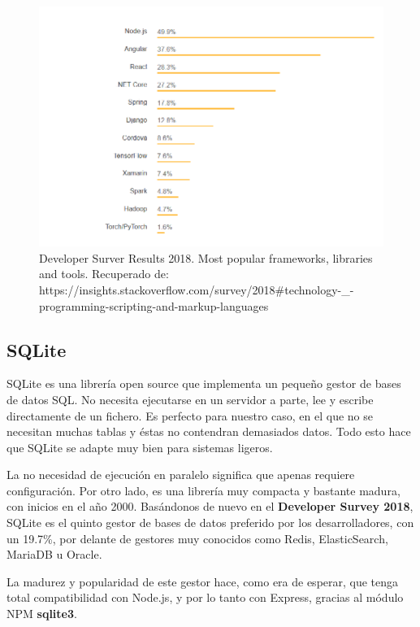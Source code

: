 \begin{figure}[H]
\centering
\includegraphics[width=6.00in]{images/frameworks_populares.png}
\caption{Developer Surver Results 2018. Most popular frameworks, libraries and tools. 
Recuperado de: https://insights.stackoverflow.com/survey/2018\#technology-\_-programming-scripting-and-markup-languages}
\label{fig:frameworks_populares}
\end{figure}

\subsection{SQLite}
SQLite es una librería open source que implementa un pequeño gestor de bases de datos SQL. No necesita ejecutarse en un servidor a parte, lee y escribe
directamente de un fichero. Es perfecto para nuestro caso, en el que no se necesitan muchas tablas y éstas no contendran demasiados datos. Todo esto hace
que SQLite se adapte muy bien para sistemas ligeros.
\par
La no necesidad de ejecución en paralelo significa que apenas requiere configuración. Por otro lado, es una librería muy compacta y bastante madura, con 
inicios en el año 2000. Basándonos de nuevo en el \textbf{Developer Survey 2018}, SQLite es el quinto gestor de bases de datos preferido por los desarrolladores,
con un 19.7\%, por delante de gestores muy conocidos como Redis, ElasticSearch, MariaDB u Oracle.
\par
La madurez y popularidad de este gestor hace, como era de esperar, que tenga total compatibilidad con Node.js, y por lo tanto con Express, gracias al módulo
NPM \textbf{sqlite3}.

